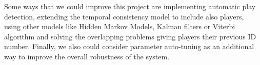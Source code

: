 Some ways that we could improve this project are implementing automatic play detection, extending the temporal consistency model to include also players, using other models like Hidden Markov Models, Kalman filters or Viterbi algorithm and solving the overlapping problems giving players their previous ID number. Finally, we also could consider parameter auto-tuning as an additional way to improve the overall robustness of the system.
